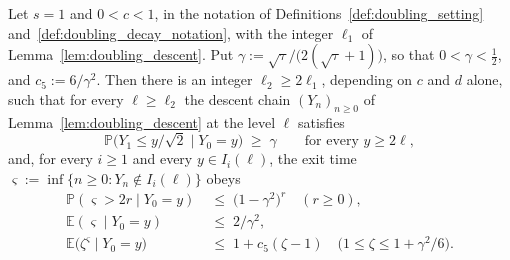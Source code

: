 \begin{lemma}\label{lem:doubling_escape}
Let $s=1$ and $0<c<1$, in the notation of Definitions~\ref{def:doubling_setting}
and~\ref{def:doubling_decay_notation}, with the integer
$\ell_1$ of Lemma~\ref{lem:doubling_descent}. Put
$\gamma:=\sqrt\tau\big/\bigl(2(\sqrt\tau+1)\bigr)$, so that $0<\gamma<\tfrac12$, and
$c_5:=6/\gamma^2$. Then there is an integer $\ell_2\geq2\ell_1$,
depending on $c$ and $d$ alone, such that for every $\ell\geq\ell_2$ the descent chain
$(Y_n)_{n\geq0}$ of Lemma~\ref{lem:doubling_descent} at the level $\ell$ satisfies
\begin{equation}\label{eq:doubling_escape}
    \mathbb P\bigl(Y_1\leq y/\sqrt2\mid Y_0=y\bigr)\;\geq\;\gamma\qquad\text{for every }y\geq2\ell,
\end{equation}
and, for every $i\geq1$ and every $y\in I_i(\ell)$, the exit time
$\varsigma:=\inf\{n\geq0:Y_n\notin I_i(\ell)\}$ obeys
\begin{equation}\label{eq:doubling_sojourn}
\begin{aligned}
    \mathbb P(\varsigma>2r\mid Y_0=y)\;&\leq\;\bigl(1-\gamma^2\bigr)^{r}\quad(r\geq0),\\
    \mathbb E(\varsigma\mid Y_0=y)\;&\leq\;2/\gamma^2,\\
    \mathbb E\bigl(\zeta^{\varsigma}\mid Y_0=y\bigr)\;&\leq\;1+c_5(\zeta-1)
    \quad\bigl(1\leq\zeta\leq1+\gamma^2/6\bigr).
\end{aligned}
\end{equation}
\end{lemma}

